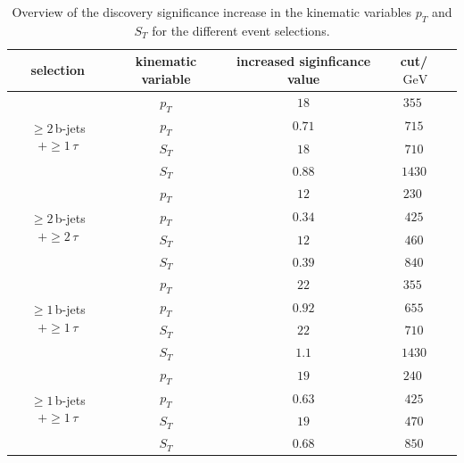 	\begin{table}[htbp]
		\centering
                \footnotesize
                \renewcommand{\arraystretch}{1.2}
		\begin{tabular*}{\linewidth}{@{\extracolsep{\fill}}ccccc}
		\hline
		\hline
		\textbf{selection}  & \textbf{kinematic variable}  & \textbf{increased siginficance value}      & \textbf{cut}/$\SI{}{\giga\electronvolt}$ 
		\\
		\hline
		\multirow{4}{*}{$\geq 2\,$b-jets $+\geq 1\,\tau$} & $p_T$      & $18$      & $\SI{355}{}$
		\\
                &       $p_T$   & $0.71$        & $715$
                \\
                &       $S_T$   & $18$        & $710$
                \\
                &       $S_T$   & $0.88$        & $1430$
                \\
		\hline
		\multirow{4}{*}{$\geq 2\,$b-jets $+\geq 2\,\tau$} & $p_T$      & $12$      & $\SI{230}{}$
		\\
                &       $p_T$   & $0.34$        & $425$
                \\
                &       $S_T$   & $12$        & $460$
                \\
                &       $S_T$   & $0.39$        & $840$
                \\
		\hline
                \multirow{4}{*}{$\geq 1\,$b-jets $+\geq 1\,\tau$} & $p_T$      & $22$      & $\SI{355}{}$
		\\
                &       $p_T$   & $0.92$        & $655$
                \\
                &       $S_T$   & $22$        & $710$
                \\
                &       $S_T$   & $1.1$        & $1430$
                \\
		\hline
                \multirow{4}{*}{$\geq 1\,$b-jets $+\geq 1\,\tau$} & $p_T$      & $19$      & $\SI{240}{}$
		\\
                &       $p_T$   & $0.63$        & $425$
                \\
                &       $S_T$   & $19$        & $470$
                \\
                &       $S_T$   & $0.68$        & $850$
                \\
                \hline
		\hline
		\end{tabular*}
		\caption[Overview of the discovery significance increase in the kinematic variables $p_T$ and $S_T$ for the different event selections.]{Overview of the discovery significance increase in the kinematic variables $p_T$ and $S_T$ for the different event selections. }
		\label{xcuts}
                \renewcommand{\arraystretch}{1}
                \end{table}
